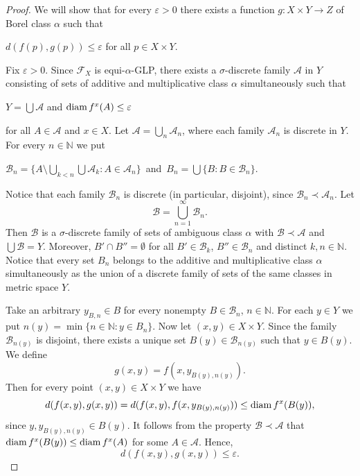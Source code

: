 \documentclass[a4paper]{amsart}
\theoremstyle{plain}
\theoremstyle{definition}
\theoremstyle{remark}
\numberwithin{equation}{section}
\begin{document}
\begin{proof} We will show that for every $\varepsilon>0$ there exists a function $g\colon X\times Y\to Z$ of Borel class $\alpha$ such that
	\begin{center}
		 $d(f(p),g(p))\le\varepsilon$ for all $p\in X\times Y$.
	\end{center} 
	Fix $\varepsilon>0$. Since $\mathscr F_X$ is equi-$\alpha$-GLP, there exists a $\sigma$-discrete family $\mathcal A$ in $Y$ consisting of sets of additive and multiplicative class $\alpha$ simultaneously such that
	\begin{center}
		  $Y=\bigcup \mathcal A$ \quad and \quad ${\rm diam}\,f^x(A)\le\varepsilon$
	\end{center} 
	for all $A\in\mathcal A$ and $x\in X$. Let $\mathcal A=\bigcup\limits_n\mathcal A_n$, where each family $\mathcal A_n$ is discrete in $Y$. For every $n\in\mathbb N$ we put 
	\begin{center}
		 	$\mathcal B_n=\{ A\setminus \bigcup\limits_{k<n}\bigcup \mathcal A_k: A\in\mathcal A_n\}$\,\,\,and\,\,\,$B_n=\bigcup\{B:B\in\mathcal B_n\}$.
	\end{center}
    Notice that each family $\mathcal B_n$ is discrete (in particular, disjoint), since $\mathcal B_n\prec\mathcal A_n$.  Let 
      $$
      \mathcal B=\bigcup\limits_{n=1}^\infty \mathcal B_n.
      $$
 	Then $\mathcal B$ is a  $\sigma$-discrete family of sets of ambiguous class $\alpha$ with $\mathcal B\prec \mathcal A$ and $\bigcup\mathcal B=Y$. Moreover, $B'\cap B''=\emptyset$ for all $B'\in\mathcal B_k$, $B''\in\mathcal B_n$ and distinct $k,n\in\mathbb N$. Notice that every set $B_n$ belongs to the additive and multiplicative class $\alpha$ simultaneously as the union of a discrete family of sets of the same classes in metric space $Y$. 
	
	Take an arbitrary $y_{B,n}\in B$ for every nonempty $B\in\mathcal B_n$, $n\in \mathbb N$. For each $y\in Y$ we put $n(y)=\min\{n\in\mathbb N: y\in B_n\}$. Now let $(x,y)\in X\times Y$. Since the family $\mathcal B_{n(y)}$ is disjoint, there exists a unique set $B(y)\in\mathcal B_{n(y)}$ such that $y\in B(y)$. We define
	$$
	g(x,y)=f(x,y_{B(y),n(y)}).
	$$
	Then for every point $(x,y)\in X\times Y$ we have 
	$$
	d(f(x,y),g(x,y))=d(f(x,y), f(x,y_{B(y),n(y)}))\le {\rm diam}\, f^x(B(y)),
	$$
	since $y, y_{B(y),n(y)}\in B(y)$. It follows from the property $\mathcal B\prec\mathcal A$ that ${\rm diam}\, f^x(B(y))\le {\rm diam}\, f^x(A)$ for some $A\in\mathcal A$. Hence,
	$$
		d(f(x,y),g(x,y))\le\varepsilon.
	$$


\end{proof}
\end{document}
